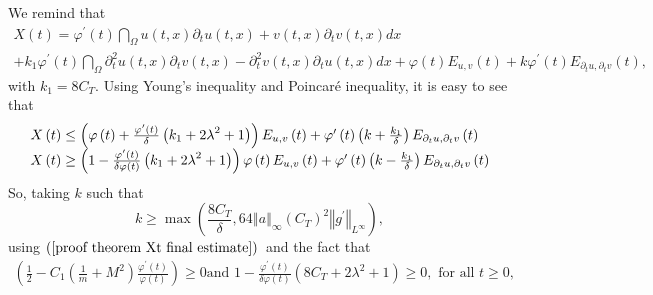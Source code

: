 \documentclass[11pt,reqno]{amsart}
\theoremstyle{plain}
\numberwithin{equation}{section}
\numberwithin{equation}{section}
\begin{document}
We remind that%
\begin{equation*}
\begin{array}{l}
X\left( t\right) =\varphi ^{\prime }\left( t\right) \dint_{\Omega }u\left(
t,x\right) \partial _{t}u\left( t,x\right) +v\left( t,x\right) \partial
_{t}v\left( t,x\right) dx \\ 
+k_{1}\varphi ^{\prime }\left( t\right) \dint_{\Omega }\partial
_{t}^{2}u\left( t,x\right) \partial _{t}v\left( t,x\right) -\partial
_{t}^{2}v\left( t,x\right) \partial _{t}u\left( t,x\right) dx+\varphi \left(
t\right) E_{u,v}\left( t\right) +k\varphi ^{\prime }\left( t\right)
E_{\partial _{t}u,\partial _{t}v}\left( t\right) ,%
\end{array}%
\end{equation*}%
with $k_{1}=8C_{T}.$ Using Young's inequality and Poincar\'{e} inequality,
it is easy to see that%
\begin{equation}
\begin{array}{l}
X\left( t\right) \leq \left( \varphi \left( t\right) +\frac{\varphi ^{\prime
}\left( t\right) }{\delta }\left( k_{1}+2\lambda ^{2}+1\right) \right)
E_{u,v}\left( t\right) +\varphi ^{\prime }\left( t\right) \left( k+\frac{%
k_{1}}{\delta }\right) E_{\partial _{t}u,\partial _{t}v}\left( t\right) \\ 
X\left( t\right) \geq \left( 1-\frac{\varphi ^{\prime }\left( t\right) }{%
\delta \varphi \left( t\right) }\left( k_{1}+2\lambda ^{2}+1\right) \right)
\varphi \left( t\right) E_{u,v}\left( t\right) +\varphi ^{\prime }\left(
t\right) \left( k-\frac{k_{1}}{\delta }\right) E_{\partial _{t}u,\partial
_{t}v}\left( t\right)%
\end{array}
\label{k estimate}
\end{equation}%
So, taking $k$ such that 
\begin{equation*}
k\geq \max \left( \frac{8C_{T}}{\delta },64\left\Vert a\right\Vert _{\infty
}\left( C_{T}\right) ^{2}\left\Vert g^{\prime }\right\Vert _{L^{\infty
}}\right) ,
\end{equation*}
using $\left( \ref{proof theorem Xt final estimate}\right) $\ and the fact
that%
\begin{equation*}
\begin{array}{c}
\left( \frac{1}{2}-C_{1}\left( \frac{1}{m}+M^{2}\right) \frac{\varphi
^{\prime }\left( t\right) }{\varphi \left( t\right) }\right) \geq 0\text{
and }1-\frac{\varphi ^{\prime }\left( t\right) }{\delta \varphi \left(
t\right) }\left( 8C_{T}+2\lambda ^{2}+1\right) \geq 0,\text{ for all }t\geq
0,%
\end{array}%
\end{equation*}%
\end{document}
